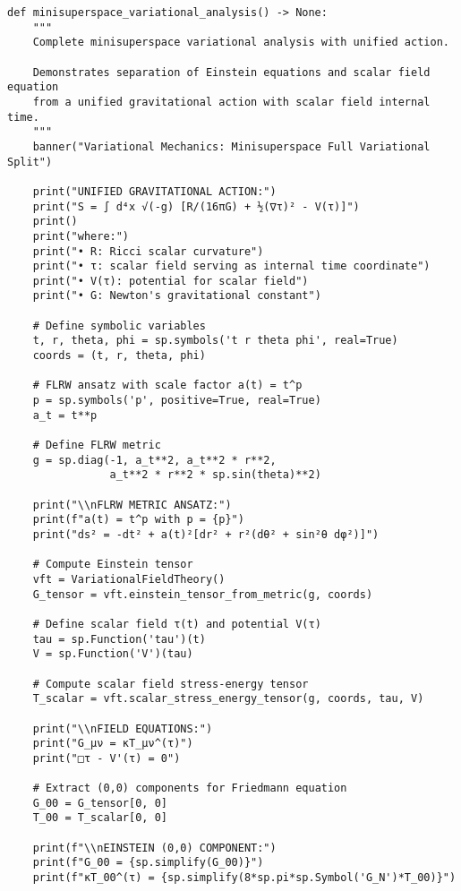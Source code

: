 \documentclass[11pt,a4paper]{article}
\theoremstyle{definition}
\theoremstyle{remark}
\begin{document}
\begin{lstlisting}
def minisuperspace_variational_analysis() -> None:
    """
    Complete minisuperspace variational analysis with unified action.
    
    Demonstrates separation of Einstein equations and scalar field equation
    from a unified gravitational action with scalar field internal time.
    """
    banner("Variational Mechanics: Minisuperspace Full Variational Split")
    
    print("UNIFIED GRAVITATIONAL ACTION:")
    print("S = ∫ d⁴x √(-g) [R/(16πG) + ½(∇τ)² - V(τ)]")
    print()
    print("where:")
    print("• R: Ricci scalar curvature")
    print("• τ: scalar field serving as internal time coordinate")
    print("• V(τ): potential for scalar field")
    print("• G: Newton's gravitational constant")
    
    # Define symbolic variables
    t, r, theta, phi = sp.symbols('t r theta phi', real=True)
    coords = (t, r, theta, phi)
    
    # FLRW ansatz with scale factor a(t) = t^p
    p = sp.symbols('p', positive=True, real=True)
    a_t = t**p
    
    # Define FLRW metric
    g = sp.diag(-1, a_t**2, a_t**2 * r**2, 
                a_t**2 * r**2 * sp.sin(theta)**2)
    
    print("\\nFLRW METRIC ANSATZ:")
    print(f"a(t) = t^p with p = {p}")
    print("ds² = -dt² + a(t)²[dr² + r²(dθ² + sin²θ dφ²)]")
    
    # Compute Einstein tensor
    vft = VariationalFieldTheory()
    G_tensor = vft.einstein_tensor_from_metric(g, coords)
    
    # Define scalar field τ(t) and potential V(τ)
    tau = sp.Function('tau')(t)
    V = sp.Function('V')(tau)
    
    # Compute scalar field stress-energy tensor
    T_scalar = vft.scalar_stress_energy_tensor(g, coords, tau, V)
    
    print("\\nFIELD EQUATIONS:")
    print("G_μν = κT_μν^(τ)")
    print("□τ - V'(τ) = 0")
    
    # Extract (0,0) components for Friedmann equation
    G_00 = G_tensor[0, 0]
    T_00 = T_scalar[0, 0]
    
    print(f"\\nEINSTEIN (0,0) COMPONENT:")
    print(f"G_00 = {sp.simplify(G_00)}")
    print(f"κT_00^(τ) = {sp.simplify(8*sp.pi*sp.Symbol('G_N')*T_00)}")
\end{lstlisting}
\end{document}
